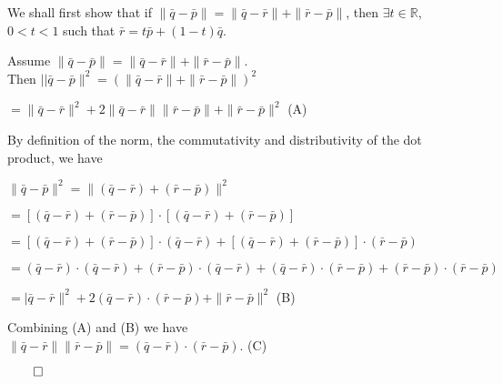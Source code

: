 \begin{proofbox}
  
We shall first show that if $\|\bar{q}-\bar{p}\| = \|\bar{q}-\bar{r}\| + \|\bar{r}-\bar{p}\|$, then
$\exists t \in \mathbb{R}$, $0 < t < 1$ such that $\bar{r} = t\bar{p} + (1-t)\bar{q}$. 

Assume $\|\bar{q}-\bar{p}\| = \|\bar{q}-\bar{r}\| + \|\bar{r}-\bar{p}\|$.\\
Then $||\bar{q}-\bar{p}\|^2 = (\|\bar{q}-\bar{r}\| + \|\bar{r}-\bar{p}\|)^2 $

$= \|\bar{q}-\bar{r}\|^2 + 2\|\bar{q}-\bar{r}\|\|\bar{r}-\bar{p}\| + \|\bar{r}-\bar{p}\|^2$ \hfill (A)

\vspace{1em}

By definition of the norm, the commutativity and distributivity of the dot product, we have

\quad $\|\bar{q} - \bar{p}\|^2 = \|(\bar{q} - \bar{r}) + (\bar{r} - \bar{p})\|^2$

\quad $= [(\bar{q} - \bar{r}) + (\bar{r} - \bar{p})] \cdot [(\bar{q} - \bar{r}) + (\bar{r} - \bar{p})]$

\quad $= [(\bar{q} - \bar{r}) + (\bar{r} - \bar{p})] \cdot (\bar{q} - \bar{r}) + [(\bar{q} - \bar{r}) + (\bar{r} - \bar{p})] \cdot (\bar{r} - \bar{p})$

\quad $= (\bar{q} - \bar{r}) \cdot (\bar{q} - \bar{r}) + (\bar{r} - \bar{p}) \cdot (\bar{q} - \bar{r}) + (\bar{q} - \bar{r}) \cdot (\bar{r} - \bar{p}) + (\bar{r} - \bar{p}) \cdot (\bar{r} - \bar{p})$

\quad $= |\bar{q} - \bar{r}\|^2 + 2(\bar{q} - \bar{r}) \cdot (\bar{r} - \bar{p}) + \|\bar{r} - \bar{p}\|^2$ \hfill (B)

Combining (A) and (B) we have\\
$\|\bar{q}-\bar{r}\|\|\bar{r}-\bar{p}\| = (\bar{q}-\bar{r}) \cdot (\bar{r}-\bar{p})$. \hfill (C)

\hfill $\qed$
\end{proofbox}

